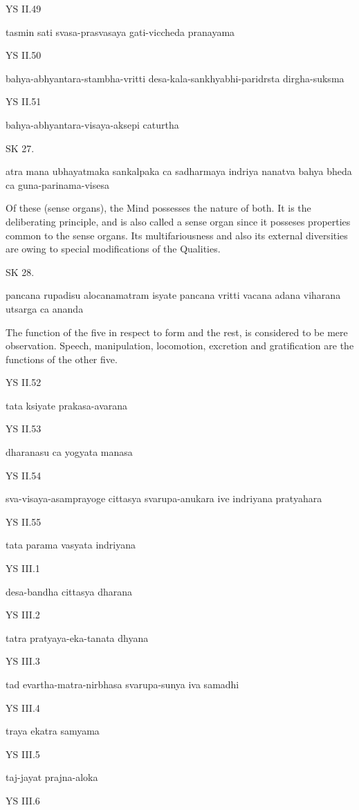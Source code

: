 YS II.49

    tasmin sati svasa-prasvasaya gati-viccheda pranayama

YS II.50

    bahya-abhyantara-stambha-vritti
    desa-kala-sankhyabhi-paridrsta dirgha-suksma

YS II.51

    bahya-abhyantara-visaya-aksepi caturtha

SK 27.

atra mana ubhayatmaka sankalpaka ca sadharmaya indriya
nanatva bahya bheda ca guna-parinama-visesa

Of these (sense organs), the Mind possesses the nature of both.
It is the deliberating principle, and is also called a sense organ
since it posseses properties common to the sense organs.
Its multifariousness and also its external diversities are owing
to special modifications of the Qualities.

SK 28.

pancana rupadisu alocanamatram isyate
pancana vritti vacana adana viharana utsarga ca ananda

The function of the five in respect to form and the rest,
is considered to be mere observation.
Speech, manipulation, locomotion, excretion and gratification
are the functions of the other five.

YS II.52

    tata ksiyate prakasa-avarana

YS II.53

    dharanasu ca yogyata manasa

YS II.54

    sva-visaya-asamprayoge cittasya svarupa-anukara ive indriyana pratyahara

YS II.55

    tata parama vasyata indriyana

YS III.1

    desa-bandha cittasya dharana

YS III.2

    tatra pratyaya-eka-tanata dhyana

YS III.3

    tad evartha-matra-nirbhasa svarupa-sunya iva samadhi

YS III.4

    traya ekatra samyama

YS III.5

    taj-jayat prajna-aloka

YS III.6

